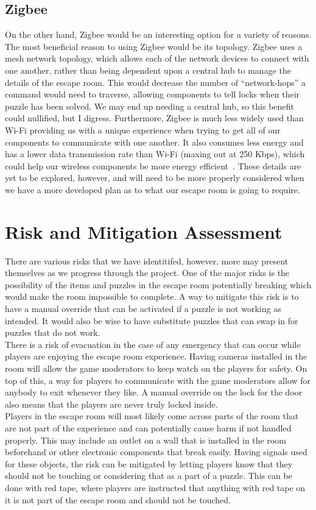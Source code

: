 \documentclass[conference]{IEEEtran}
\begin{document}
\subsection*{Zigbee}
On the other hand, Zigbee would be an interesting option for a variety of reasons. The most beneficial reason to using
Zigbee would be its topology. Zigbee uses a mesh network topology, which allows each of the network devices to connect with
one another, rather than being dependent upon a central hub to manage the details of the escape room. This would decrease
the number of ``network-hops'' a command would need to traverse, allowing components to tell locks when their puzzle has been
solved. We may end up needing a central hub, so this benefit could nullified, but I digress. Furthermore, Zigbee is much less
widely used than Wi-Fi providing us with a unique experience when trying to get all of our components to communicate
with one another. It also consumes less energy and has a lower data transmission rate than Wi-Fi (maxing out at 250 Kbps),
which could help our wireless components be more energy efficient~\cite{wifiVsZigbee}. These details are yet to be explored,
however, and will need to be more properly considered when we have a more developed plan as to what our escape room is going to require.

\section{Risk and Mitigation Assessment}
There are various risks that we have identitifed, however, more may present
themselves as we progress through the project. One of the major risks is
the possibility of the items and puzzles in the escape room potentially
breaking which would make the room impossible to complete. A way
to mitigate this risk is to have a manual override that can be activated
if a puzzle is not working as intended. It would also be wise to have
substitute puzzles that can swap in for puzzles that do not work.
\\
\indent There is a risk of evacuation in the case of any emergency that can occur
while players are enjoying the escape room experience. Having cameras
installed in the room will allow the game moderators to keep watch on
the players for safety. On top of this, a way for players to communicate
with the game moderators allow for anybody to exit whenever they like.
A manual override on the lock for the door also means that the
players are never truly locked inside.
\\
\indent Players in the escape room will most likely come across parts of the room
that are not part of the experience and can potentially cause harm if not
handled properly. This may include an outlet on a wall that is installed
in the room beforehand or other electronic components that break easily.
Having signals used for these objects, the risk can be mitigated by letting
players know that they should not be touching or considering that as a
part of a puzzle. This can be done with red tape, where players are instructed
that anything with red tape on it is not part of the escape room and should
not be touched.
\end{document}

